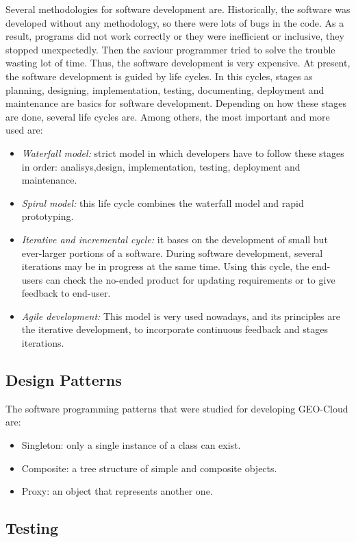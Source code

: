 Several methodologies for software development are. Historically, the software
was developed without any methodology, so there were lots of bugs in the
code. As a result, programs did not work correctly or they were inefficient or
inclusive, they stopped unexpectedly. Then the saviour programmer tried to solve
the trouble wasting lot of time. Thus, the software development is very
expensive. 
At present, the software development is guided by life cycles. In this cycles,
stages as planning, designing, implementation, testing, documenting, deployment
and maintenance are basics for software development. Depending on how these
stages are done, several life cycles are. Among others, the most important and
more used are:
\begin{itemize}
\item \emph{Waterfall model:} strict model in which developers have to follow these
  stages in order: analisys,design, implementation, testing, deployment and maintenance.
\item \emph{Spiral model:} this life cycle combines the waterfall model and rapid
  prototyping.
\item \emph{Iterative and incremental cycle:} it bases on the development of small but
  ever-larger portions of a software. During software development, several
  iterations may be in progress at the same time. Using this cycle, the
  end-users can check the no-ended product for updating requirements or to give feedback
  to end-user.
\item \emph{Agile development:} This model is very used nowadays, and its principles
  are the iterative development, to incorporate continuous feedback and
  stages iterations. 
\end{itemize}

\subsection{Design Patterns}

The software programming patterns that were studied for developing GEO-Cloud
are:
\begin{itemize}
\item Singleton: only a single instance of a class can exist.
\item Composite: a tree structure of simple and composite objects.
\item Proxy: an object that represents another one.
\end{itemize}

\subsection{Testing}

